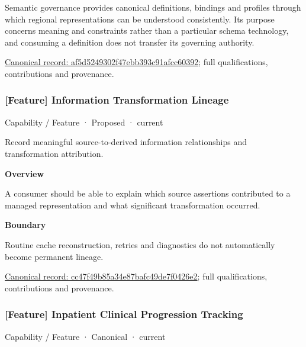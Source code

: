 Semantic governance provides canonical definitions, bindings and profiles through which regional representations can be understood consistently. Its purpose concerns meaning and constraints rather than a particular schema technology, and consuming a definition does not transfer its governing authority.


{\footnotesize \href{../../../../continuum/strategy/capability/feature/af5d5249302f47ebb393c91afcc60392.md}{Canonical record: af5d5249302f47ebb393c91afcc60392}; full qualifications, contributions and provenance.}\par
\subsubsection{[Feature] Information Transformation Lineage}

\label{element:cc47f49b85a34e87bafc49de7f0426e2}
{\small Capability / Feature · Proposed · current}\par

Record meaningful source-to-derived information relationships and transformation attribution.



\textbf{Overview}



A consumer should be able to explain which source assertions contributed to a managed representation and what significant transformation occurred.



\textbf{Boundary}



Routine cache reconstruction, retries and diagnostics do not automatically become permanent lineage.


{\footnotesize \href{../../../../continuum/strategy/capability/feature/cc47f49b85a34e87bafc49de7f0426e2.md}{Canonical record: cc47f49b85a34e87bafc49de7f0426e2}; full qualifications, contributions and provenance.}\par
\subsubsection{[Feature] Inpatient Clinical Progression Tracking}

\label{element:863265027ecb432595b9c6d45adf1190}
{\small Capability / Feature · Canonical · current}\par

